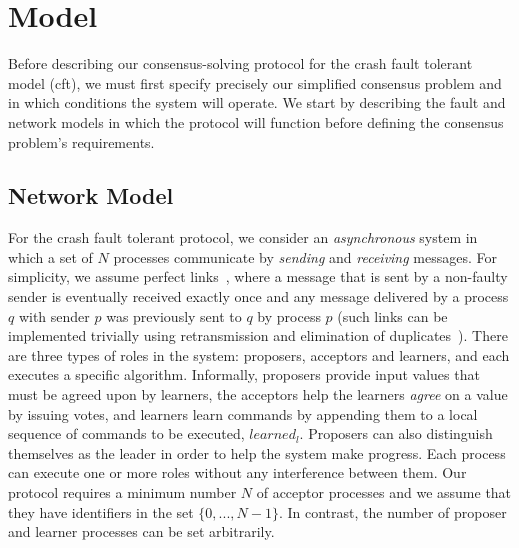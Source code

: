 \section{Model} \label{cft_model}

Before describing our consensus-solving protocol for the crash fault tolerant model (\acrshort{cft}), we must first specify precisely our simplified consensus problem and in which conditions the system will operate. We start by describing the fault and network models in which the protocol will function before defining the consensus problem's requirements.

\subsection{Network Model}
For the crash fault tolerant protocol, we consider an \emph{asynchronous} system in which a set of $N$ processes communicate by \emph{sending} and \emph{receiving} messages. For simplicity, we assume perfect links~\cite{cgr:book}, where a message that is sent by a non-faulty sender is eventually received exactly once and any message delivered by a process $q$ with sender $p$ was previously sent to $q$ by process $p$ (such links can be implemented trivially using retransmission and elimination of duplicates~\cite{cgr:book}). There are three types of roles in the system: proposers, acceptors and learners, and each executes a specific algorithm. Informally, proposers provide input values that must be agreed upon by learners, the acceptors help the learners \emph{agree} on a value by issuing votes, and learners learn commands by appending them to a local sequence of commands to be executed, $learned_l$. Proposers can also distinguish themselves as the leader in order to help the system make progress. Each process can execute one or more roles without any interference between them. Our protocol requires a minimum number $N$ of acceptor processes and we assume that they have identifiers in the set $\{0,...,N-1\}$. In contrast, the number of proposer and learner processes can be set arbitrarily.

